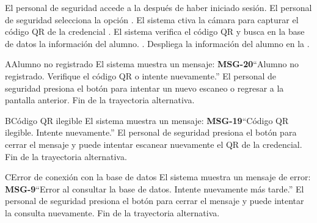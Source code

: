 \begin{UCtrayectoria}
	\UCpaso[\UCactor] El personal de seguridad accede a la  después de haber iniciado sesión.
	\UCpaso[\UCactor] El personal de seguridad selecciona la opción .
	\UCpaso El sistema ctiva la cámara para capturar el código QR de la credencial .
	\UCpaso El sistema verifica el código QR y busca en la base de datos la información del alumno. .
	\UCpaso Despliega la información del alumno en la .
\end{UCtrayectoria}
\begin{UCtrayectoriaA}{A}{Alumno no registrado}
	\UCpaso El sistema muestra un mensaje: {\bf MSG-20}{``Alumno no registrado. Verifique el código QR o intente nuevamente.''}
	\UCpaso[\UCactor] El personal de seguridad presiona el botón  para intentar un nuevo escaneo o regresar a la pantalla anterior.
	\UCpaso Fin de la trayectoria alternativa.
\end{UCtrayectoriaA}

\begin{UCtrayectoriaA}{B}{Código QR ilegible}
	\UCpaso El sistema muestra un mensaje: {\bf MSG-19}{``Código QR ilegible. Intente nuevamente.''}
	\UCpaso[\UCactor] El personal de seguridad presiona el botón  para cerrar el mensaje y puede intentar escanear nuevamente el QR de la credencial.
	\UCpaso Fin de la trayectoria alternativa.
\end{UCtrayectoriaA}

\begin{UCtrayectoriaA}{C}{Error de conexión con la base de datos}
	\UCpaso El sistema muestra un mensaje de error: {\bf MSG-9}{``Error al consultar la base de datos. Intente nuevamente más tarde.''}
	\UCpaso[\UCactor] El personal de seguridad presiona el botón  para cerrar el mensaje y puede intentar la consulta nuevamente.
	\UCpaso Fin de la trayectoria alternativa.
\end{UCtrayectoriaA}

